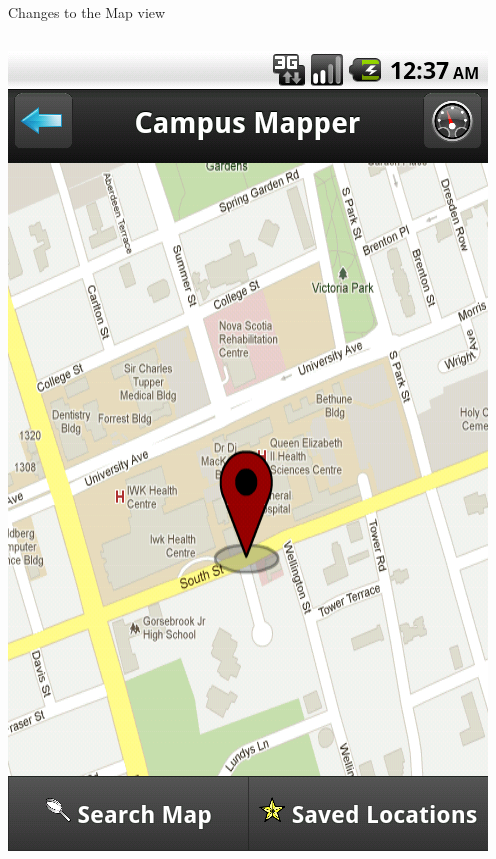 \documentclass{beamer}
\begin{document}
\begin{frame}{Changes to the Map view}
    \begin{columns}[c]
        \center\includegraphics[height=0.5 \textheight]{pre-heuristic/map-blank.png}

\end{columns}
\end{frame}
\end{document}
